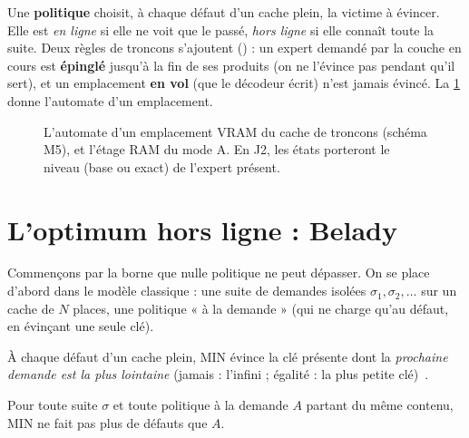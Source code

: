 Une \textbf{politique} choisit, à chaque défaut d'un cache plein, la victime à évincer. Elle est \emph{en ligne} si elle ne voit que le passé, \emph{hors ligne} si elle connaît toute la suite. Deux règles de troncons s'ajoutent () : un expert demandé par la couche en cours est \textbf{épinglé} jusqu'à la fin de ses produits (on ne l'évince pas pendant qu'il sert), et un emplacement \textbf{en vol} (que le décodeur écrit) n'est jamais évincé. La \cref{fig:t2o-automate} donne l'automate d'un emplacement.

\begin{figure}[ht]
\centering
\SchemaCchAutomate
\caption[L'automate d'un emplacement d'expert]{L'automate d'un emplacement VRAM du cache de troncons (schéma M5), et l'étage RAM du mode A. En J2, les états porteront le niveau (base ou exact) de l'expert présent.}
\label{fig:t2o-automate}
\end{figure}

\section{L'optimum hors ligne : Belady}\label{sec:t2o-belady}

Commençons par la borne que nulle politique ne peut dépasser. On se place d'abord dans le modèle classique : une suite de demandes isolées $\sigma_1, \sigma_2, \ldots$ sur un cache de $N$ places, une politique « à la demande » (qui ne charge qu'au défaut, en évinçant une seule clé).

\begin{definition}\label{def:t2o-min}
À chaque défaut d'un cache plein, MIN évince la clé présente dont la \emph{prochaine demande est la plus lointaine} (jamais : l'infini ; égalité : la plus petite clé)~\cite{belady1966}.
\end{definition}

\begin{theoreme}\label{thm:t2o-belady}
Pour toute suite $\sigma$ et toute politique à la demande $A$ partant du même contenu, MIN ne fait pas plus de défauts que $A$.
\end{theoreme}

